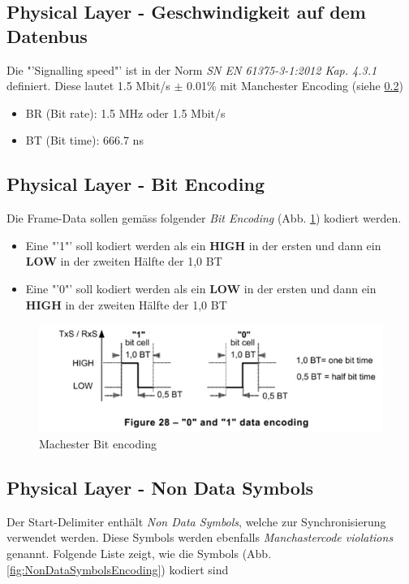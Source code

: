 

\subsection{Physical Layer - Geschwindigkeit auf dem Datenbus}
Die "'Signalling speed"' ist in der Norm \textit{SN EN 61375-3-1:2012 Kap. 4.3.1} definiert. Diese lautet 1.5 Mbit/s $\pm$ 0.01\% mit Manchester Encoding (siehe \ref{subsub:BitEncoding})

\begin{itemize}
  \item BR (Bit rate): 1.5 MHz oder 1.5 Mbit/s
  \item BT (Bit time): 666.7 ns
\end{itemize}

\subsection{Physical Layer - Bit Encoding}
\label{subsub:BitEncoding}
Die Frame-Data sollen gemäss folgender \textit{Bit Encoding} (Abb. \ref{fig:manchester_Bit_Encoding}) kodiert werden.

\begin{itemize}
    \item Eine "'1"' soll kodiert werden als ein \textbf{HIGH} in der ersten und dann ein \textbf{LOW} in der zweiten Hälfte der 1,0 BT
    \item Eine "'0"' soll kodiert werden als ein \textbf{LOW} in der ersten und dann ein \textbf{HIGH} in der zweiten Hälfte der 1,0 BT
\end{itemize}

\begin{figure}[h!]
    \centering
    \includegraphics[width = 0.7 \textwidth]{Figures/Chap2/Grundlagen/MVB_DOKU/Layer/Bit_Encoding.png}
    \caption{Machester Bit encoding}
    \label{fig:manchester_Bit_Encoding}
\end{figure}

\subsection{Physical Layer - Non Data Symbols} 
\label{subsub:NonDataSymbols}
Der Start-Delimiter enthält \textit{Non Data Symbols}, welche zur Synchronisierung verwendet werden. Diese Symbols werden ebenfalls \textit{Manchastercode violations} genannt. Folgende Liste zeigt, wie die Symbols (Abb. \ref{fig:NonDataSymbolsEncoding}) kodiert sind


